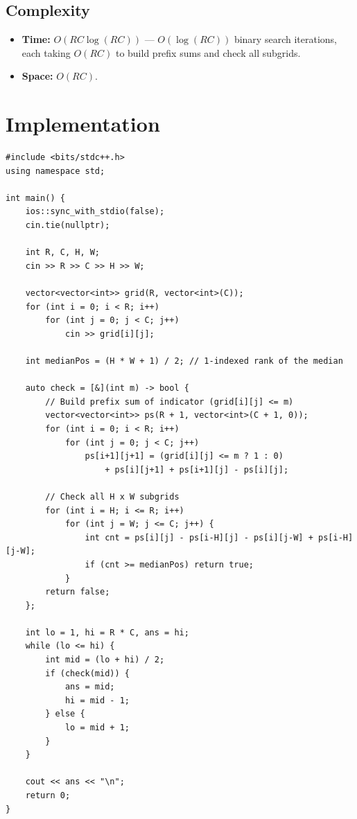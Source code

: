 \documentclass[11pt,a4paper]{article}
\begin{document}
\subsection{Complexity}
\begin{itemize}
    \item \textbf{Time:} $O(RC \log(RC))$ --- $O(\log(RC))$ binary search iterations, each taking $O(RC)$ to build prefix sums and check all subgrids.
    \item \textbf{Space:} $O(RC)$.
\end{itemize}

\section{Implementation}

\begin{lstlisting}
#include <bits/stdc++.h>
using namespace std;

int main() {
    ios::sync_with_stdio(false);
    cin.tie(nullptr);

    int R, C, H, W;
    cin >> R >> C >> H >> W;

    vector<vector<int>> grid(R, vector<int>(C));
    for (int i = 0; i < R; i++)
        for (int j = 0; j < C; j++)
            cin >> grid[i][j];

    int medianPos = (H * W + 1) / 2; // 1-indexed rank of the median

    auto check = [&](int m) -> bool {
        // Build prefix sum of indicator (grid[i][j] <= m)
        vector<vector<int>> ps(R + 1, vector<int>(C + 1, 0));
        for (int i = 0; i < R; i++)
            for (int j = 0; j < C; j++)
                ps[i+1][j+1] = (grid[i][j] <= m ? 1 : 0)
                    + ps[i][j+1] + ps[i+1][j] - ps[i][j];

        // Check all H x W subgrids
        for (int i = H; i <= R; i++)
            for (int j = W; j <= C; j++) {
                int cnt = ps[i][j] - ps[i-H][j] - ps[i][j-W] + ps[i-H][j-W];
                if (cnt >= medianPos) return true;
            }
        return false;
    };

    int lo = 1, hi = R * C, ans = hi;
    while (lo <= hi) {
        int mid = (lo + hi) / 2;
        if (check(mid)) {
            ans = mid;
            hi = mid - 1;
        } else {
            lo = mid + 1;
        }
    }

    cout << ans << "\n";
    return 0;
}
\end{lstlisting}
\end{document}

